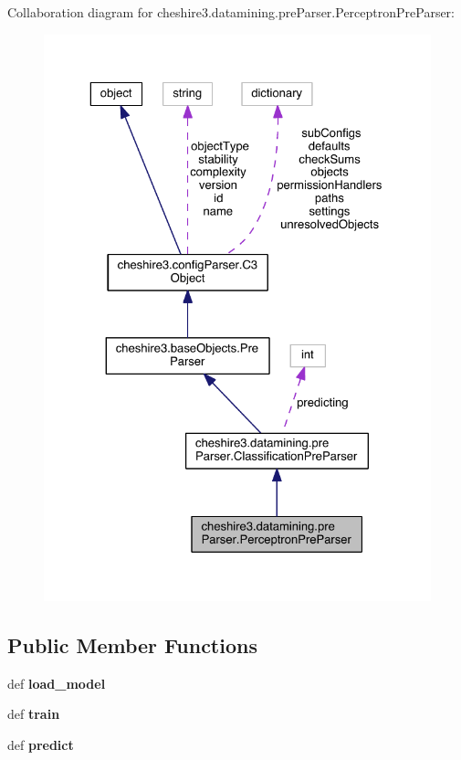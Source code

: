 Collaboration diagram for cheshire3.\-datamining.\-pre\-Parser.\-Perceptron\-Pre\-Parser\-:
\nopagebreak
\begin{figure}[H]
\begin{center}
\leavevmode
\includegraphics[width=325pt]{classcheshire3_1_1datamining_1_1pre_parser_1_1_perceptron_pre_parser__coll__graph}
\end{center}
\end{figure}
\subsection*{Public Member Functions}
\begin{DoxyCompactItemize}
\item 
\hypertarget{classcheshire3_1_1datamining_1_1pre_parser_1_1_perceptron_pre_parser_a5df9823059209086b6abd093d06cceab}{def {\bfseries load\-\_\-model}}\label{classcheshire3_1_1datamining_1_1pre_parser_1_1_perceptron_pre_parser_a5df9823059209086b6abd093d06cceab}

\item 
\hypertarget{classcheshire3_1_1datamining_1_1pre_parser_1_1_perceptron_pre_parser_a82c68d34ffb8adfbe4d115989463210a}{def {\bfseries train}}\label{classcheshire3_1_1datamining_1_1pre_parser_1_1_perceptron_pre_parser_a82c68d34ffb8adfbe4d115989463210a}

\item 
\hypertarget{classcheshire3_1_1datamining_1_1pre_parser_1_1_perceptron_pre_parser_a10eb6c24434a76f27786a8e5ea42ab9f}{def {\bfseries predict}}\label{classcheshire3_1_1datamining_1_1pre_parser_1_1_perceptron_pre_parser_a10eb6c24434a76f27786a8e5ea42ab9f}

\end{DoxyCompactItemize}

